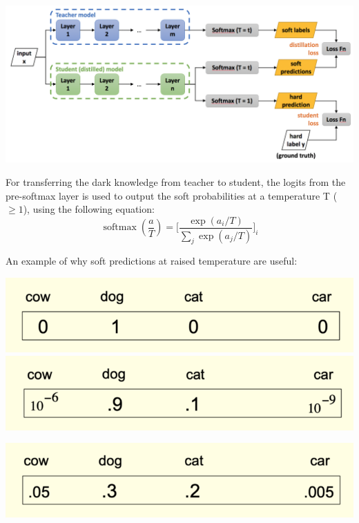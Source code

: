\documentclass{article} %
\begin{document}
	\begin{center}
		\includegraphics[width=\linewidth]{fig/kd_12}
	\end{center}
	
	For transferring the dark knowledge from teacher to student, the logits from the pre-softmax layer is used to output the soft probabilities at a temperature T ($\geq 1$), using the following equation:
	\begin{equation}
		\operatorname{softmax}\left( \frac{a}{T} \right) = \Big[ \frac{\exp(a_i / T)}{\sum_{j} \exp(a_j / T)} \Big]_i
	\end{equation}
	
	An example of why soft predictions at raised temperature are useful:
	\begin{center}
		\includegraphics[width=0.48\linewidth]{fig/kd_7}
		\includegraphics[width=0.48\linewidth]{fig/kd_8}
	\end{center}
	\begin{center}
		\includegraphics[width = 0.5 \linewidth]{fig/kd_9}
	\end{center}
	
\end{document}
